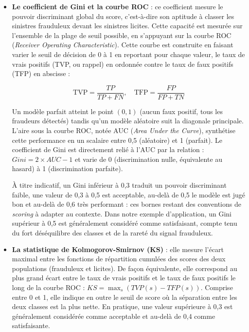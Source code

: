 \begin{itemize}[label = $\bullet$]
    \item \textbf{Le coefficient de Gini et la courbe ROC} : ce coefficient mesure le pouvoir discriminant global du score, c'est-à-dire son aptitude à classer les sinistres frauduleux devant les sinistres licites. Cette capacité est mesurée sur l'ensemble de la plage de seuil possible, en s'appuyant sur la courbe ROC (\textit{Receiver Operating Characteristic}). Cette courbe est construite en faisant varier le seuil de décision de 0 à 1 en reportant pour chaque valeur, le taux de vrais positifs (TVP, ou rappel) en ordonnée contre le taux de faux positifs (TFP) en abscisse : 
    
    \begin{equation}
        \text{TVP} = \frac{TP}{TP + FN}, \quad \text{TFP} = \frac{FP}{FP + TN}
    \end{equation}
    
    Un modèle parfait atteint le point $(0, 1)$ (aucun faux positif, tous les fraudeurs détectés) tandis qu'un modèle aléatoire suit la diagonale principale.  L'aire sous la courbe ROC, notée AUC (\textit{Area Under the Curve}), synthétise cette performance en un scalaire entre 0,5 (aléatoire) et 1 (parfait). Le coefficient de Gini est directement relié à l'AUC par la relation : $Gini = 2 \times AUC - 1$ et varie de 0 (discrimination nulle, équivalente au hasard) à 1 (discrimination parfaite).

    À titre indicatif, un Gini inférieur à 0,3 traduit un pouvoir discriminant faible, une valeur de 0,3 à 0,5 est acceptable, au-delà de 0,5 le modèle est jugé bon et au-delà de 0,6 très performant : ces bornes restant des conventions de \textit{scoring} à adapter au contexte. Dans notre exemple d'application, un Gini supérieur à 0,5 est généralement considéré comme satisfaisant, compte tenu du fort déséquilibre des classes et de la rareté du signal frauduleux.

    \item \textbf{La statistique de Kolmogorov-Smirnov (KS)} : elle mesure l'écart maximal entre les fonctions de répartition cumulées des scores des deux populations (frauduleux et licites). De façon équivalente, elle correspond au plus grand écart entre le taux de vrais positifs et le taux de faux positifs le long de la courbe ROC : $KS = \max_s \left( TVP(s) - TFP(s) \right)$. Comprise entre 0 et 1, elle indique en outre le seuil de score où la séparation entre les deux classes est la plus nette. En pratique, une valeur supérieure à 0,3 est généralement considérée comme acceptable et au-delà de 0,4 comme satisfaisante.
    

\end{itemize}
